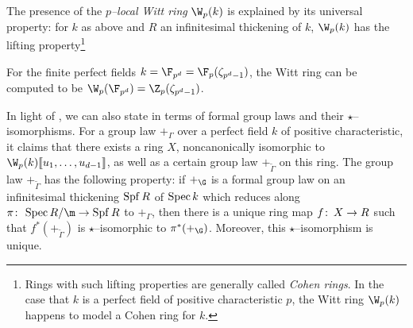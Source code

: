 \begin{remark}
The presence of the \textit{$p$--local Witt ring} $\W_p(k)$ is explained by its universal property: for $k$ as above and $R$ an infinitesimal thickening of $k$, $\W_p(k)$ has the lifting property\footnote{Rings with such lifting properties are generally called \textit{Cohen rings}.  In the case that $k$ is a perfect field of positive characteristic $p$, the Witt ring $\W_p(k)$ happens to model a Cohen ring for $k$.}
\begin{center}
\end{center}
For the finite perfect fields $k = \F_{p^d} = \F_p(\zeta_{p^d-1})$, the Witt ring can be computed to be $\W_p(\F_{p^d}) = \Z_p(\zeta_{p^d-1})$.
\end{remark}

\begin{remark}\label{LubinTateModuliThmInFGLTerms}
In light of , we can also state  in terms of formal group laws and their $\star$--isomorphisms.  For a group law $+_\Gamma$ over a perfect field $k$ of positive characteristic, it claims that there exists a ring $X$, noncanonically isomorphic to $\W_p(k)\ps{u_1, \ldots, u_{d-1}}$, as well as a certain group law $+_{\widetilde \Gamma}$ on this ring.  The group law $+_{\widetilde \Gamma}$ has the following property: if $+_\G$ is a formal group law on an infinitesimal thickening $\operatorname{Spf} R$ of $\operatorname{Spec} k$ which reduces along $\pi\co \Spec R/\m \to \Spf R$ to $+_\Gamma$, then there is a unique ring map $f\colon\thinspace X \to R$ such that $f^* (+_{\widetilde \Gamma})$ is $\star$--isomorphic to $\pi^* (+_{\G})$.  Moreover, this $\star$--isomorphism is unique.
\end{remark}

